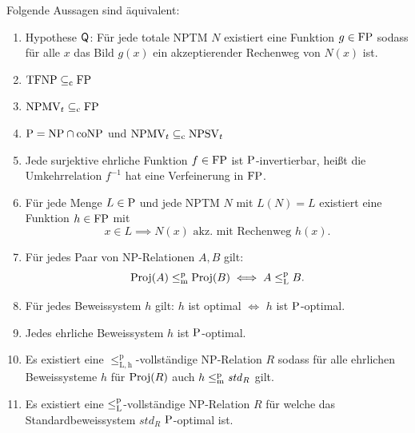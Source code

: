 \begin{theorem}\label{thm:q}
    Folgende Aussagen sind äquivalent:
    \begin{enumerate}[midpenalty=0]
        \item Hypothese $\hQ$: Für jede totale NPTM $N$  existiert eine Funktion $g\in\FP$ sodass für alle $x$ das Bild $g(x)$ ein akzeptierender Rechenweg von $N(x)$ ist.
        \item $\TFNP\subseteqc \FP$
        \item $\mathrm{NPMV}_t\subseteqc \FP$
        \item $\P=\NP\cap\coNP$ und $\mathrm{NPMV}_t\subseteqc \mathrm{NPSV}_t$
        \item Jede surjektive ehrliche Funktion $f\in\FP$ ist $\P$-invertierbar, heißt die Umkehrrelation $f^{-1}$ hat eine Verfeinerung in $\FP$. 
        \item Für jede Menge $L\in \P$  und jede NPTM $N$ mit $L(N)=L$ existiert eine Funktion $h\in \FP$ mit 
            \[ x\in L \implies N(x) \text{ akz. mit Rechenweg $h(x)$}. \]
        \item Für jedes Paar von NP-Relationen $A, B$ gilt:
            \[ \Proj(A) \leqmp \Proj(B) \iff A \leqlp B. \]
        \item Für jedes Beweissystem $h$ gilt: $h$ ist optimal $\iff$ $h$ ist $\P$-optimal. 
        \item Jedes ehrliche Beweissystem $h$ ist $\P$-optimal. 
        \item Es existiert eine $\leq_\mathrm{L,h}^\mathrm p$-vollständige NP-Relation $R$ sodass für alle ehrlichen Beweissysteme $h$ für $\Proj(R)$ auch $h\leqmp \mathit{std}_R$ gilt.
        \item Es existiert eine $\leqlp$-vollständige NP-Relation $R$ für welche das Standardbeweissystem $\mathit{std}_R$ $\P$-optimal ist.
    \end{enumerate}
\end{theorem}
